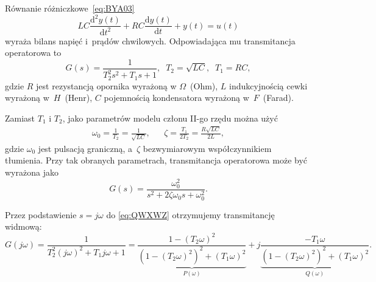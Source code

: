 \documentclass[paper=a4,DIV=12]{lpas}
\newcommand{\od}[2]{\frac{\mathrm{d}#1}{\mathrm{d}#2}}
\newcommand{\odn}[3]{\frac{\mathrm{d}^{#1}#2}{\mathrm{d}{#3}^{#1}}}
\begin{document}
\begin{appendices}
  Równanie różniczkowe~\eqref{eq:BYA03}
  \begin{equation}
    L C \odn{2}{y(t)}{t} + R C \od{y(t)}{t} + y(t) = u(t)
    \label{eq:BYA03}
  \end{equation}
  wyraża bilans napięć i~prądów chwilowych. Odpowiadająca mu transmitancja
  operatorowa to
  \begin{equation}
    G(s) = \frac{1}{T_2^2 s^2 + T_1 s + 1},
    \;\; T_2 = \sqrt{LC}, \;\; T_1 = RC,
    \label{eq:QWXWZ}
  \end{equation}
  gdzie $R$ jest rezystancją opornika wyrażoną w $\Omega$~(Ohm), $L$
  indukcyjnością cewki wyrażoną w~$H$~(Henr), $C$ pojemnością kondensatora
  wyrażoną w~$F$~(Farad).

  Zamiast $T_1$ i $T_2$, jako parametrów modelu członu II-go rzędu można użyć
  \begin{equation}
    \begin{aligned}
      &
      \omega_0 = \frac{1}{T_2} = \frac{1}{\sqrt{LC}},
      &&
      \zeta = \frac{T_1}{2 T_2} = \frac{R\sqrt{LC}}{2L},
      &
    \end{aligned}
  \end{equation}
  gdzie $\omega_0$ jest pulsacją graniczną, a~$\zeta$ bezwymiarowym
  współczynnikiem tłumienia. Przy tak obranych parametrach, transmitancja
  operatorowa może być wyrażona jako
  \begin{equation}
    G(s) = \frac{\omega_0^2}{s^2 + 2\zeta\omega_0 s + \omega_0^2}.
    \label{eq:7FANL}
  \end{equation}

  Przez podstawienie $s = j\omega$ do \eqref{eq:QWXWZ}
  otrzymujemy transmitancję widmową:
  \begin{equation}
    G(j\omega) = \frac{1}{T_2^2 (j \omega)^2 + T_1 j\omega + 1}
    = \underbrace{\frac{1 - (T_2\omega)^2}{\left(1-(T_2\omega)^2\right)^2 + (T_1\omega)^2}}_{P(\omega)}
    + j \underbrace{\frac{-T_1\omega}{\left(1-(T_2\omega)^2\right)^2 + (T_1\omega)^2}}_{Q(\omega)}.
    \label{eq:LS6G7}
  \end{equation}


\end{appendices}
\end{document}
